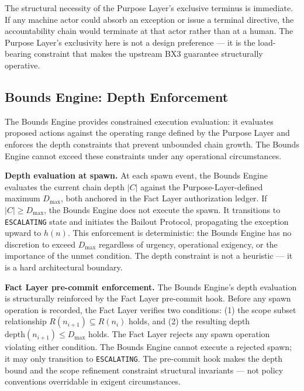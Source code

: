 The structural necessity of the Purpose Layer's exclusive terminus is immediate. If any machine actor could absorb an exception or issue a terminal directive, the accountability chain would terminate at that actor rather than at a human. The Purpose Layer's exclusivity here is not a design preference — it is the load-bearing constraint that makes the upstream BX3 guarantee structurally operative.

\subsection{Bounds Engine: Depth Enforcement}
\label{sec:rs-bounds-depth}

The Bounds Engine provides constrained execution evaluation: it evaluates proposed actions against the operating range defined by the Purpose Layer and enforces the depth constraints that prevent unbounded chain growth. The Bounds Engine cannot exceed these constraints under any operational circumstances.

\medskip
\noindent\textbf{Depth evaluation at spawn.} At each spawn event, the Bounds Engine evaluates the current chain depth $|C|$ against the Purpose-Layer-defined maximum $D_{\mathrm{max}}$, both anchored in the Fact Layer authorization ledger. If $|C| \geq D_{\mathrm{max}}$, the Bounds Engine does not execute the spawn. It transitions to \texttt{ESCALATING} state and initiates the Bailout Protocol, propagating the exception upward to $h(n)$. This enforcement is deterministic: the Bounds Engine has no discretion to exceed $D_{\mathrm{max}}$ regardless of urgency, operational exigency, or the importance of the unmet condition. The depth constraint is not a heuristic — it is a hard architectural boundary.

\medskip
\noindent\textbf{Fact Layer pre-commit enforcement.} The Bounds Engine's depth evaluation is structurally reinforced by the Fact Layer pre-commit hook. Before any spawn operation is recorded, the Fact Layer verifies two conditions: (1) the scope subset relationship $R(n_{i+1}) \subseteq R(n_i)$ holds, and (2) the resulting depth $\mathrm{depth}(n_{i+1}) \leq D_{\mathrm{max}}$ holds. The Fact Layer rejects any spawn operation violating either condition. The Bounds Engine cannot execute a rejected spawn; it may only transition to \texttt{ESCALATING}. The pre-commit hook makes the depth bound and the scope refinement constraint structural invariants — not policy conventions overridable in exigent circumstances.

